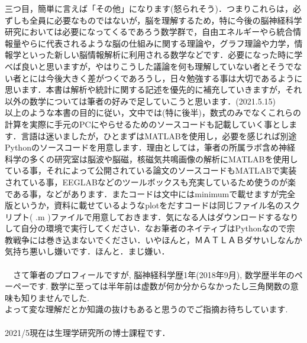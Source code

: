 \documentclass[11pt,a4paper]{jreport}
\begin{document}
三つ目，簡単に言えば「その他」になります(怒られそう)．つまりこれらは，必ずしも全員に必要なものではないが，脳を理解するため，特に今後の脳神経科学研究においては必要になってくるであろう数学群で，自由エネルギーやら統合情報量やらに代表されるような脳の仕組みに関する理論や，グラフ理論や力学，情報学といった新しい脳情報解析に利用される数学などです．必要になった時に学べば良いと思いますが，やはりこうした議論を何も理解していない者とそうでない者とには今後大きく差がつくであろうし，日々勉強する事は大切であるように思います．本書は解析や統計に関する記述を優先的に補充していきますが，それ以外の数学については筆者の好みで足していこうと思います．(2021.5.15)\\
  以上のような本書の目的に従い，文中では(特に後半)，数式のみでなくこれらの計算を実際に手元のPCにやらせるためのソースコードも記載していく事とします．言語は迷いましたが，ひとまずはMATLABを使用し，必要を感じれば別途Pythonのソースコードを用意します．理由としては，筆者の所属ラボ含め神経科学の多くの研究室は脳波や脳磁，核磁気共鳴画像の解析にMATLABを使用している事，それによって公開されている論文のソースコードもMATLABで実装されている事，EEGLABなどのツールボックスも充実しているため使うのが楽である事，などがあります．またコードは文中にはminimumで載せますが完全版というか，資料に載せているようなplotをだすコードは同じファイル名のスクリプト( .m )ファイルで用意しておきます．気になる人はダウンロードするなりして自分の環境で実行してください．なお筆者のネイティブはPythonなので宗教戦争には巻き込まないでください．いやほんと，ＭＡＴＬＡＢダサいしなんか気持ち悪いし嫌いです．ほんと．まじ嫌い．\\
\\

　さて筆者のプロフィールですが, 脳神経科学歴1年(2018年9月), 数学歴半年のペーペーです. 数学に至っては半年前は虚数が何か分からなかったし三角関数の意味も知りませんでした.\\
よって変な理解だとか知識の抜けもあると思うのでご指摘お待ちしています.\\
\\
2021/5現在は生理学研究所の博士課程です．
\\
\end{document}
